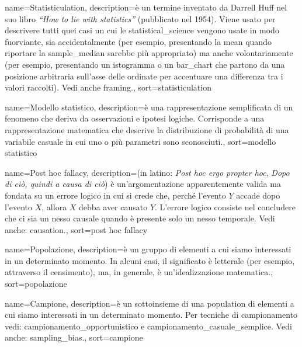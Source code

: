 {
	 name={Statisticulation},
	 description={\`e un termine inventato da Darrell Huff nel suo libro \emph{``How to lie with statistics''} (pubblicato nel 1954). Viene usato per descrivere tutti quei casi un cui le \gls{statistical_science} vengono usate in modo fuorviante, sia accidentalmente (per esempio, presentando la \gls{mean} quando riportare la \gls{sample_median} sarebbe pi\`u appropriato) ma anche volontariamente (per esempio, presentando un \gls{istogramma} o un \gls{bar_chart} che partono da una posizione arbitraria sull'asse delle ordinate per accentuare una differenza tra i valori raccolti).  Vedi anche \gls{framing}.},
	 sort={statisticulation}
}

{
	name={Modello statistico},
	description={\`e una rappresentazione semplificata di un fenomeno che deriva da osservazioni e ipotesi logiche. Corrisponde a una rappresentazione matematica che descrive la distribuzione di probabilit\`a di una variabile casuale in cui uno o pi\`u parametri sono sconosciuti.},
	sort={modello statistico}
}


{
	name={Post hoc fallacy},
	description={(in latino: \emph{Post hoc ergo propter hoc}, \emph{Dopo di ci\`o, quindi a causa di ci\`o}) \`e un'argomentazione apparentemente valida ma fondata su un errore logico in cui si crede che, perch\'e l'evento $Y$ accade dopo l'evento $X$, allora $X$ debba aver causato $Y$. L'errore logico consiste nel concludere che ci sia un nesso causale quando \`e presente solo un nesso temporale. Vedi anche: \gls{causation}.},
	sort={post hoc fallacy}
}



{
	 name={Popolazione},
	 description={\`e un gruppo di elementi a cui siamo interessati in un determinato momento. In alcuni casi, il significato \`e letterale (per esempio, attraverso il censimento), ma, in generale, \`e un'idealizzazione matematica.},
	 sort={popolazione}
}

{
	 name={Campione},
	 description={\`e un sottoinsieme di una \gls{population} di elementi a cui siamo interessati in un determinato momento. Per tecniche di campionamento vedi: \gls{campionamento_opportunistico} e \gls{campionamento_casuale_semplice}. Vedi anche: \gls{sampling_bias}.},
	 sort={campione}
}

